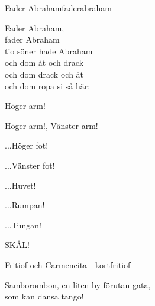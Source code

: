 \begin{song}{Fader Abraham}{faderabraham}
\begin{vers}
Fader Abraham,\\
fader Abraham\\
tio söner hade Abraham\\
och dom åt och drack\\
och dom drack och åt\\
och dom ropa si så här;\\
\end{vers}
\begin{vers}
Höger arm!
\end{vers}
\begin{vers}
Höger arm!, Vänster arm!
\end{vers}
\begin{vers}
...Höger fot! 
\end{vers}
\begin{vers}
...Vänster fot!
\end{vers}
\begin{vers}
...Huvet!  
\end{vers}
\begin{vers}
...Rumpan!
\end{vers}
\begin{vers}
...Tungan!
\end{vers}
\begin{vers}
SKÅL!
\end{vers}
\end{song}

\begin{song}{Fritiof och Carmencita - kort}{fritiof}
	\begin{vers}
		Samborombon, en liten by förutan gata,\\
		som kan dansa tango!\\
	\end{vers}
\end{song}

\newpage

